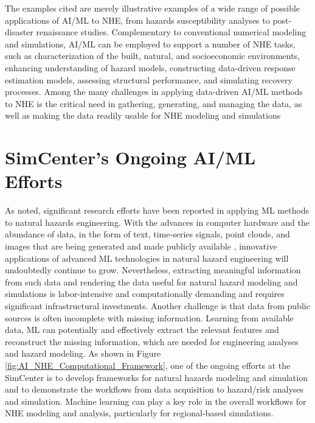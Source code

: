The examples cited are merely illustrative examples of a wide range of possible applications of AI/ML to NHE, from hazards susceptibility analyses to post-disaster renaissance studies. Complementary to conventional numerical modeling and simulations, AI/ML can be employed to support a number of NHE tasks, such as characterization of the built, natural, and socioeconomic environments, enhancing understanding of hazard models, constructing data-driven response estimation models, assessing structural performance, and simulating recovery processes. Among the many challenges in applying data-driven AI/ML methods to NHE is the critical need in gathering, generating, and managing the data, as well as making the data readily usable for NHE modeling and simulations \citep{padgett2020workshop}

\section{SimCenter's Ongoing AI/ML Efforts}
\label{sec:ai_simcenter}

As noted, significant research efforts have been reported in applying ML methods to natural hazards engineering. With the advances in computer hardware and the abundance of data, in the form of text, time-series signals, point clouds, and images that are being generated and made publicly available \citep{rathje2017designsafe}, innovative applications of advanced ML technologies in natural hazard engineering will undoubtedly continue to grow. Nevertheless, extracting meaningful information from such data and rendering the data useful for natural hazard modeling and simulations is labor-intensive and computationally demanding and requires significant infrastructural investments. Another challenge is that data from public sources is often incomplete with missing information. Learning from available data, ML can potentially and effectively extract the relevant features and reconstruct the missing information, which are needed for engineering analyses and hazard modeling. As shown in Figure \ref{fig:AI_NHE_Computational_Framework}, one of the ongoing efforts at the SimCenter is to develop frameworks for natural hazards modeling and simulation and to demonstrate the workflows from data acquisition to hazard/risk analyses and simulation. Machine learning can play a key role in the overall workflows for NHE modeling and analysis, particularly for regional-based simulations. 

